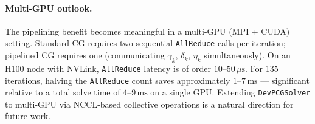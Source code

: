 \paragraph{Multi-GPU outlook.}
The pipelining benefit becomes meaningful in a multi-GPU (MPI + CUDA) setting.
Standard CG requires two sequential \texttt{AllReduce} calls per iteration;
pipelined CG requires one (communicating $\gamma_k$, $\delta_k$, $\eta_k$
simultaneously).
On an H100 node with NVLink, \texttt{AllReduce} latency is of order
$10$--$50\,\mu\mathrm{s}$.
For 135 iterations, halving the \texttt{AllReduce} count saves
approximately $1$--$7\,\mathrm{ms}$ --- significant relative to a total
solve time of $4$--$9\,\mathrm{ms}$ on a single GPU.
Extending \texttt{DevPCGSolver} to multi-GPU via NCCL-based collective
operations is a natural direction for future work.

